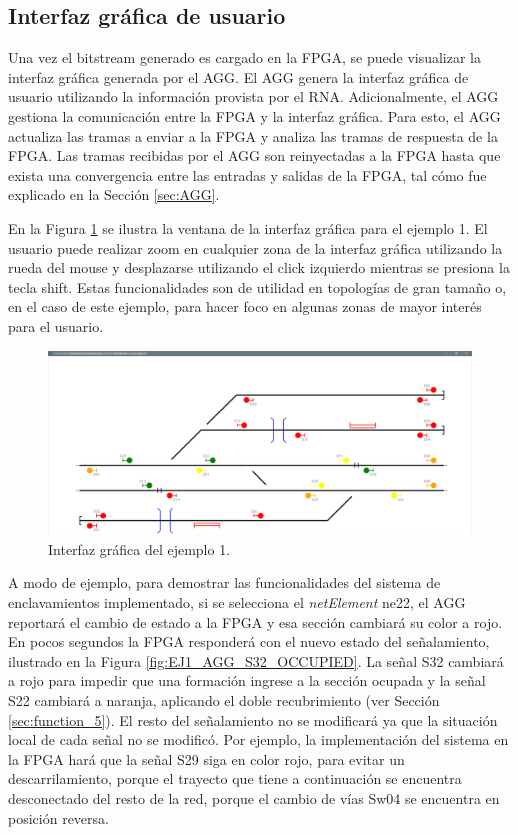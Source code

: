 \subsection{Interfaz gráfica de usuario}
	\label{sec:AGG_GUI}
		
	Una vez el bitstream generado es cargado en la FPGA, se puede visualizar la interfaz gráfica generada por el AGG. El AGG genera la interfaz gráfica de usuario utilizando la información provista por el RNA. Adicionalmente, el AGG gestiona la comunicación entre la FPGA y la interfaz gráfica. Para esto, el AGG actualiza las tramas a enviar a la FPGA y analiza las tramas de respuesta de la FPGA. Las tramas recibidas por el AGG son reinyectadas a la FPGA hasta que exista una convergencia entre las entradas y salidas de la FPGA, tal cómo fue explicado en la Sección \ref{sec:AGG}.
		
	En la Figura \ref{fig:EJ1_AGG} se ilustra la ventana de la interfaz gráfica para el ejemplo 1. El usuario puede realizar zoom en cualquier zona de la interfaz gráfica utilizando la rueda del mouse y desplazarse utilizando el click izquierdo mientras se presiona la tecla shift. Estas funcionalidades son de utilidad en topologías de gran tamaño o, en el caso de este ejemplo, para hacer foco en algunas zonas de mayor interés para el usuario.
	
	\begin{figure}[H]
		\centering
		\includegraphics[origin = c, width=1\textwidth]{resultados-obtenidos/ejemplo1/images/AGG_S32_YES}
		\centering\caption{Interfaz gráfica del ejemplo 1.}
		\label{fig:EJ1_AGG}
	\end{figure}
	
	A modo de ejemplo, para demostrar las funcionalidades del sistema de enclavamientos implementado, si se selecciona el \textit{netElement} ne22, el AGG reportará el cambio de estado a la FPGA y esa sección cambiará su color a rojo. En pocos segundos la FPGA responderá con el nuevo estado del señalamiento, ilustrado en la Figura \ref{fig:EJ1_AGG_S32_OCCUPIED}. La señal S32 cambiará a rojo para impedir que una formación ingrese a la sección ocupada y la señal S22 cambiará a naranja, aplicando el doble recubrimiento (ver Sección \ref{sec:function_5}). El resto del señalamiento no se modificará ya que la situación local de cada señal no se modificó. Por ejemplo, la implementación del sistema en la FPGA hará que la señal S29 siga en color rojo, para evitar un descarrilamiento, porque el trayecto que tiene a continuación se encuentra desconectado del resto de la red, porque el cambio de vías Sw04 se encuentra en posición reversa.
	
